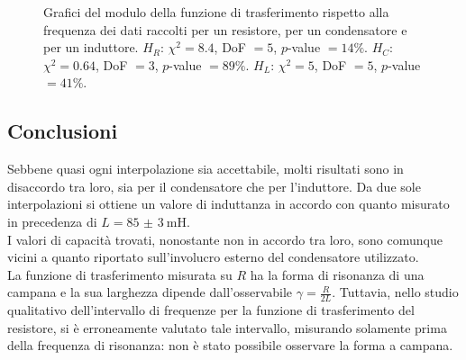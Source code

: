 \documentclass[a4paper]{article}
\begin{document}
\vspace*{-0.75cm}
\begin{figure}[ht]
	\centering
    	\hspace*{-0.75cm}
	\caption[Grafici RLC]{Grafici del modulo della funzione di trasferimento rispetto alla frequenza dei dati raccolti per un resistore, per un condensatore e per un induttore. $H_R$: $\chi^2=8.4$, DoF $=5$, $p$-value $=14\%$. $H_C$: $\chi^2=0.64$, DoF $=3$, $p$-value $=89\%$. $H_L$: $\chi^2=5$, DoF $=5$, $p$-value $=41\%$.}
	\label{fig:RLC_graph_L}
\end{figure}

\subsection{Conclusioni}
Sebbene quasi ogni interpolazione sia accettabile, molti risultati sono in disaccordo tra loro, sia per il condensatore che per l'induttore. Da due sole interpolazioni si ottiene un valore di induttanza in accordo con quanto misurato in precedenza di $L=\SI{85(3)}{\milli\henry}$.\\
I valori di capacità trovati, nonostante non in accordo tra loro, sono comunque vicini a quanto riportato sull'involucro esterno del condensatore utilizzato.\\

La funzione di trasferimento misurata su $R$ ha la forma di risonanza di una campana e la sua larghezza dipende dall'osservabile $\gamma = \frac{R}{2L}$. Tuttavia, nello studio qualitativo dell'intervallo di frequenze per la funzione di trasferimento del resistore, si è erroneamente valutato tale intervallo, misurando solamente prima della frequenza di risonanza: non è stato possibile osservare la forma a campana.
\end{document}
